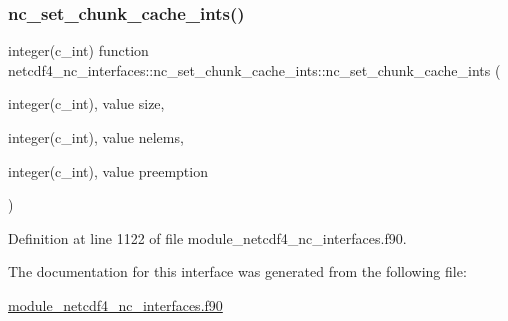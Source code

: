 \subsubsection{\texorpdfstring{nc\+\_\+set\+\_\+chunk\+\_\+cache\+\_\+ints()}{nc\_set\_chunk\_cache\_ints()}}
{\footnotesize\ttfamily integer(c\+\_\+int) function netcdf4\+\_\+nc\+\_\+interfaces\+::nc\+\_\+set\+\_\+chunk\+\_\+cache\+\_\+ints\+::nc\+\_\+set\+\_\+chunk\+\_\+cache\+\_\+ints (\begin{DoxyParamCaption}\item[{integer(c\+\_\+int), value}]{size,  }\item[{integer(c\+\_\+int), value}]{nelems,  }\item[{integer(c\+\_\+int), value}]{preemption }\end{DoxyParamCaption})}



Definition at line 1122 of file module\+\_\+netcdf4\+\_\+nc\+\_\+interfaces.\+f90.



The documentation for this interface was generated from the following file\+:\begin{DoxyCompactItemize}
\item 
\hyperlink{module__netcdf4__nc__interfaces_8f90}{module\+\_\+netcdf4\+\_\+nc\+\_\+interfaces.\+f90}\end{DoxyCompactItemize}
